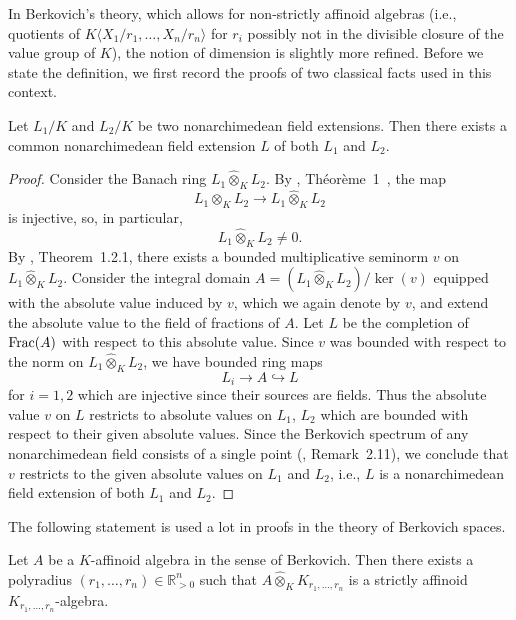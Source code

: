 In Berkovich's theory, which allows for non-strictly affinoid algebras
(i.e., quotients of \(K\langle X_{1} / r_{1}, \ldots, X_{n} / r_{n}\rangle \) 
for \(r_{i}\) possibly not in the divisible closure of the value group of \(K\)),
the notion of dimension is slightly more refined. Before we state the definition, we first record the proofs of two classical facts used in this context. 
\begin{lemma}\label{Common field extensions}Let $L_{1}/K$ and $L_{2}/K$ be two nonarchimedean field extensions. Then there exists a common nonarchimedean field extension $L$ of both $L_{1}$ and $L_{2}$. \end{lemma}
\begin{proof}Consider the Banach ring $L_{1}\widehat{\otimes}_{K}L_{2}$. By \cite{Gruson}, Théorème~1~, the map \begin{equation*}L_{1}\otimes_{K}L_{2}\to L_{1}\widehat{\otimes}_{K}L_{2}\end{equation*}is injective, so, in particular, \begin{equation*}L_{1}\widehat{\otimes}_{K}L_{2}\neq 0.\end{equation*}By \cite{Berkovich}, Theorem~1.2.1, there exists a bounded multiplicative seminorm $v$ on $L_{1}\widehat{\otimes}_{K}L_{2}$. Consider the integral domain $A=(L_{1}\widehat{\otimes}_{K}L_{2})/\ker(v)$ equipped with the absolute value induced by $v$, which we again denote by $v$, and extend the absolute value to the field of fractions of $A$. Let $L$ be the completion of $\mathrm{Frac}(A)$ with respect to this absolute value. Since $v$ was bounded with respect to the norm on $L_{1}\widehat{\otimes}_{K}L_{2}$, we have bounded ring maps \begin{equation*}L_{i}\to A\hookrightarrow L\end{equation*}for $i=1, 2$ which are injective since their sources are fields. Thus the absolute value $v$ on $L$ restricts to absolute values on $L_{1}$, $L_{2}$ which are bounded with respect to their given absolute values. Since the Berkovich spectrum of any nonarchimedean field consists of a single point (\cite{Kedlaya18}, Remark~2.11), we conclude that $v$ restricts to the given absolute values on $L_{1}$ and $L_{2}$, i.e., $L$ is a nonarchimedean field extension of both $L_{1}$ and $L_{2}$.  \end{proof}
The following statement is used a lot in proofs in the theory of Berkovich spaces. 
\begin{lemma}\label{Strictly affinoid}Let $A$ be a $K$-affinoid algebra in the sense of Berkovich. Then there exists a polyradius $(r_1,\dots, r_n)\in \mathbb{R}_{>0}^{n}$ such that $A\widehat{\otimes}_{K}K_{r_1,\dots, r_n}$ is a strictly affinoid $K_{r_1,\dots, r_n}$-algebra.\end{lemma}
